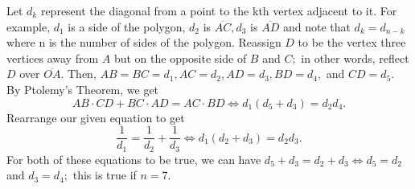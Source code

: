 \begin{solution}\hfil\medskip

  Let $d_k$ represent the diagonal from a point to the kth vertex adjacent to it.     For example, $d_1$ is a side of the polygon, $d_2$ is $\overline{AC}, d_3$ is $\overline{AD}$ and note that $d_k = d_{n - k}$ where n is the number of sides of the polygon. Reassign $D$ to be the vertex three vertices away from $A$ but on the opposite side of $B$ and $C;$ in other words, reflect $D$ over $\overline{OA}.$ Then, $AB = BC = d_1, AC = d_2, AD = d_3, BD = d_4,$ and $CD = d_5.$ By Ptolemy's Theorem, we get $$AB \cdot CD + BC \cdot AD = AC \cdot BD \iff d_1\left(d_5 + d_3\right) = d_2d_4.$$ Rearrange our given equation to get $$\dfrac{1}{d_1} = \dfrac{1}{d_2} + \dfrac{1}{d_3} \iff d_1\left(d_2 + d_3\right) = d_2d_3.$$ For both of these equations to be true, we can have $d_5 + d_3 = d_2 + d_3 \iff d_5 = d_2$ and $d_3 = d_4;$ this is true if \(n = \boxed{7}\).
\end{solution}